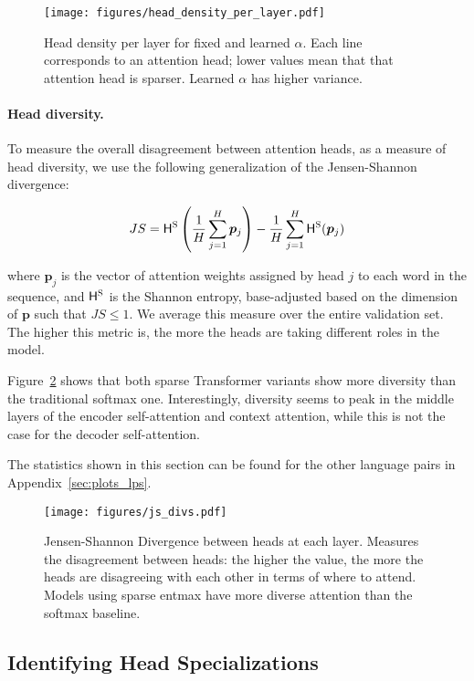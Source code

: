 \documentclass[11pt,a4paper]{article}
\newcommand{\figref}[1]{Figure~\ref{fig:#1}}
\newcommand{\HHs}{\mathsf{H}^\textsc{S}}
\newcommand{\appref}[1]{Appendix~\ref{sec:#1}}
\newcommand*\entmaxtext{entmax\xspace}
\begin{document}
\begin{figure}[t]
    \centering
        \texttt{[image: figures/head\_density\_per\_layer.pdf]}
        \caption{\label{fig:head_density_per_layer}
    Head density per layer for fixed and learned $\alpha$. Each line
    corresponds to an attention head; lower values mean that that
    attention head is sparser. Learned $\alpha$ has higher variance.
    }
\end{figure}

\paragraph{Head diversity.}
To measure the overall disagreement between attention heads, as a measure of
head diversity, we use the following generalization of the Jensen-Shannon
divergence:

\begin{equation}
JS = \HHs\left(\frac{1}{H}\sum_{j=1}^H \bm{p}_{j}\right) - \frac{1}{H}\sum_{j=1}^{H}
\HHs(\bm{p}_j)
\end{equation}

where $\bm{p}_j$ is the vector of attention weights assigned by head
$j$ to each word in the sequence, and $\HHs$ is the Shannon entropy,
base-adjusted based on the dimension of $\bm{p}$ such that $JS \leq
1$. We average this measure over the entire validation set. The
higher this metric is, the more the heads are taking different roles
in the model.

\figref{js_divs}  shows that both sparse Transformer variants show more
diversity than the traditional softmax one. Interestingly, diversity seems to
peak in the middle layers of the encoder self-attention and context attention,
while this is not the case for the decoder self-attention.

The statistics shown in this section can be found for the other language pairs in
\appref{plots_lps}.

\begin{figure}[h]
    \texttt{[image: figures/js\_divs.pdf]}
    \caption{\label{fig:js_divs}
Jensen-Shannon Divergence between heads at each layer. Measures the
disagreement between heads: the higher the value, the more the heads
are disagreeing with each other in terms of where to attend. Models
using sparse \entmaxtext have more diverse attention than the softmax
baseline.
}
\end{figure}

\subsection{Identifying Head Specializations}
\end{document}
